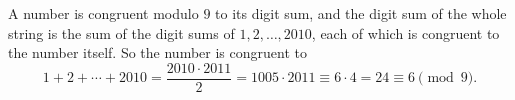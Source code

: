 A number is congruent modulo $9$ to its digit sum, and the digit sum of the whole string is the sum of the digit sums of $1,2,\dots,2010$, each of which is congruent to the number itself. So the number is congruent to
\[
1+2+\cdots+2010=\dfrac{2010\cdot2011}{2}=1005\cdot2011\equiv6\cdot4=24\equiv\boxed{6}\pmod9 .
\]
